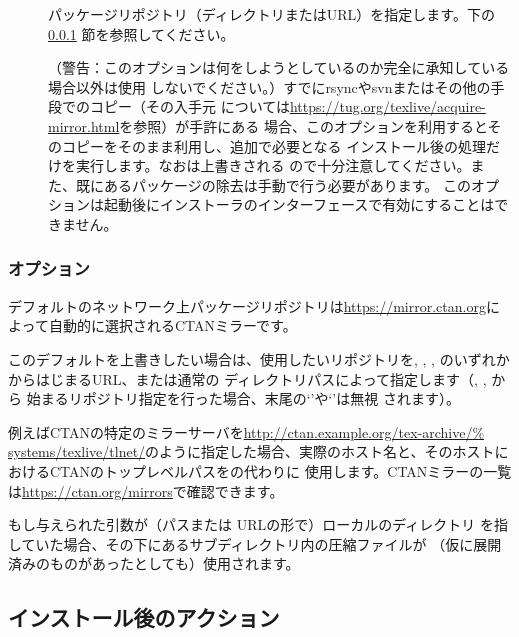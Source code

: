 \documentclass[uplatex,dvipdfmx,12pt,tombow]{jsarticle}
\begin{document}
\begin{description}
\item[]
パッケージリポジトリ（ディレクトリまたはURL）を指定します。下の\ref{sec:location}%
節を参照してください。

\item[]
（警告：このオプションは何をしようとしているのか完全に承知している場合以外は使用
しないでください。）すでにrsyncやsvnまたはその他の手段で\TL のコピー（その入手元
については\url{https://tug.org/texlive/acquire-mirror.html}を参照）が手許にある
場合、このオプションを利用するとそのコピーをそのまま利用し、追加で必要となる
インストール後の処理だけを実行します。なおは上書きされる
ので十分注意してください。また、既にあるパッケージの除去は手動で行う必要があります。
このオプションは起動後にインストーラのインターフェースで有効にすることはできません。
\end{description}

\subsubsection{オプション}
\label{sec:location}

デフォルトのネットワーク上パッケージリポジトリは\url{https://mirror.ctan.org}に
よって自動的に選択されるCTANミラーです。

このデフォルトを上書きしたい場合は、使用したいリポジトリを, , , のいずれかからはじまるURL、または通常の
ディレクトリパスによって指定します（, , から
始まるリポジトリ指定を行った場合、末尾の`\code{/}'や`'は無視
されます）。

例えばCTANの特定のミラーサーバを\url{http://ctan.example.org/tex-archive/%
systems/texlive/tlnet/}のように指定した場合、実際のホスト名と、そのホストに
おけるCTANのトップレベルパスをの代わりに
使用します。CTANミラーの一覧は\url{https://ctan.org/mirrors}で確認できます。

もし与えられた引数が（パスまたは URLの形で）ローカルのディレクトリ
を指していた場合、その下にあるサブディレクトリ内の圧縮ファイルが
（仮に展開済みのものがあったとしても）使用されます。

\subsection{インストール後のアクション}
\label{sec:postinstall}
\end{document}
